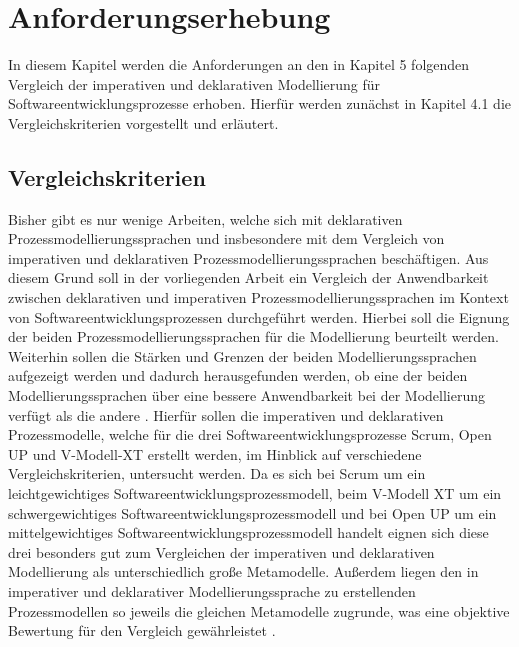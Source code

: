 
\chapter{Anforderungserhebung}\label{sec:chapter5}
In diesem Kapitel werden die Anforderungen an den in Kapitel 5 folgenden Vergleich der imperativen und deklarativen Modellierung für Softwareentwicklungsprozesse erhoben. Hierfür werden zunächst in Kapitel 4.1 die Vergleichskriterien vorgestellt und erläutert. 

\section{Vergleichskriterien}\label{sec:chapter5:Vergleichskriterien}

Bisher gibt es nur wenige Arbeiten, welche sich mit deklarativen Prozessmodellierungssprachen und insbesondere mit dem Vergleich von imperativen und deklarativen Prozessmodellierungssprachen beschäftigen. Aus diesem Grund soll in der vorliegenden Arbeit ein Vergleich der Anwendbarkeit zwischen deklarativen und imperativen Prozessmodellierungssprachen im Kontext von Softwareentwicklungsprozessen durchgeführt werden. Hierbei soll die Eignung der beiden Prozessmodellierungssprachen für die Modellierung beurteilt werden. Weiterhin sollen die Stärken und Grenzen der beiden Modellierungssprachen aufgezeigt werden und dadurch herausgefunden werden, ob eine der beiden Modellierungssprachen über eine bessere Anwendbarkeit bei der Modellierung verfügt als die andere \cite{list2006evaluation}.\newline
Hierfür sollen die imperativen und deklarativen Prozessmodelle, welche für die drei Softwareentwicklungsprozesse Scrum, Open UP und V-Modell-XT erstellt werden, im Hinblick auf verschiedene Vergleichskriterien, untersucht werden. Da es sich bei Scrum um ein leichtgewichtiges Softwareentwicklungsprozessmodell, beim V-Modell XT um ein schwergewichtiges Softwareentwicklungsprozessmodell und bei Open UP um ein mittelgewichtiges Softwareentwicklungsprozessmodell handelt eignen sich diese drei besonders gut zum Vergleichen der imperativen und deklarativen Modellierung als unterschiedlich große Metamodelle. Außerdem liegen den in imperativer und deklarativer Modellierungssprache zu erstellenden Prozessmodellen so jeweils die gleichen Metamodelle zugrunde, was eine objektive Bewertung für den Vergleich gewährleistet \cite{list2006evaluation}. \newline

